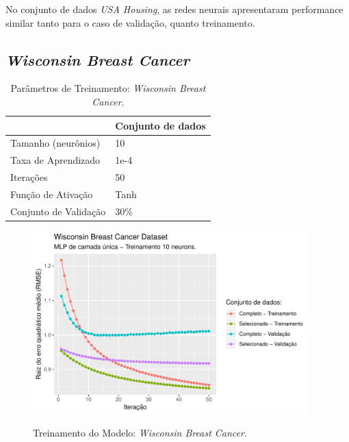 No conjunto de dados \textit{USA Housing}, as redes neurais apresentaram performance similar tanto para o caso de validação, quanto treinamento.

\FloatBarrier
\subsection{\textit{Wisconsin Breast Cancer}}

\begin{table}[!htb]
    \caption{Parâmetros de Treinamento: \textit{Wisconsin Breast Cancer}.}
    \begin{center}
        \begin{tabular}{@{}ll@{}}
        \toprule
                            & Conjunto de dados \\ \midrule
        Tamanho (neurônios)     & 10                \\
        Taxa de Aprendizado   & 1e-4              \\
        Iterações             & 50                \\
        Função de Ativação    & Tanh              \\
        Conjunto de Validação & $30\%$            \\ \bottomrule
        \end{tabular}
    \end{center}
    \label{tbl:treinamento_cancer}
\end{table}

\begin{figure}[!htb]
    \centering
    \caption{Treinamento do Modelo: \textit{Wisconsin Breast Cancer}.}
    \includegraphics[height=200pt]{imgs/res/WisconsinBreastCancerDataset_model.pdf}
    \label{fig:modelo_WisconsinBreastCancerDataset_model}
\end{figure}

